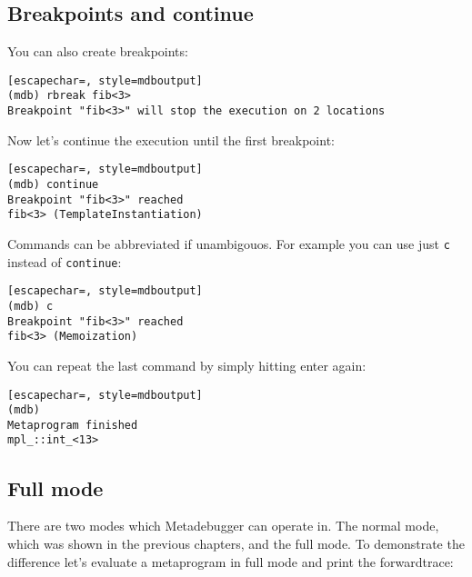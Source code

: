 \subsection{Breakpoints and continue}

You can also create breakpoints:

\begin{minipage}{\linewidth}
\begin{lstlisting}[escapechar=, style=mdboutput]
(mdb) rbreak fib<3>
Breakpoint "fib<3>" will stop the execution on 2 locations
\end{lstlisting}
\end{minipage}

Now let's continue the execution until the first breakpoint:

\begin{minipage}{\linewidth}
\begin{lstlisting}[escapechar=, style=mdboutput]
(mdb) continue
Breakpoint "fib<3>" reached
fib<3> (TemplateInstantiation)
\end{lstlisting}
\end{minipage}

Commands can be abbreviated if unambigouos. For example you can use just
\texttt{c} instead of \texttt{continue}:

\begin{minipage}{\linewidth}
\begin{lstlisting}[escapechar=, style=mdboutput]
(mdb) c
Breakpoint "fib<3>" reached
fib<3> (Memoization)
\end{lstlisting}
\end{minipage}

You can repeat the last command by simply hitting enter again:

\begin{minipage}{\linewidth}
\begin{lstlisting}[escapechar=, style=mdboutput]
(mdb)
Metaprogram finished
mpl_::int_<13>
\end{lstlisting}
\end{minipage}

\subsection{Full mode}

There are two modes which Metadebugger can operate in. The normal mode, which
was shown in the previous chapters, and the full mode. To demonstrate the
difference let's evaluate a metaprogram in full mode and print the
forwardtrace:

